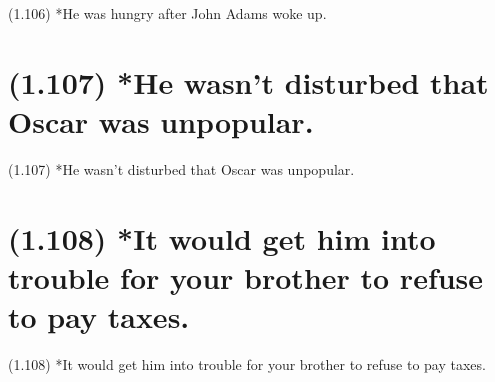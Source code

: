 \documentclass{article}
\begin{document}
\bigbreak
\begin{enumerate*}
\item[(1.106)] *He was hungry after John Adams woke up.
\end{enumerate*}
\bigbreak

\clearpage

%
%

\section*{(1.107) *He wasn't disturbed that Oscar was unpopular.}

\bigbreak
\begin{enumerate*}
\item[(1.107)] *He wasn't disturbed that Oscar was unpopular.
\end{enumerate*}
\bigbreak

\clearpage

%
%

\section*{(1.108) *It would get him into trouble for your brother to refuse to pay taxes.}

\bigbreak
\begin{enumerate*}
\item[(1.108)] *It would get him into trouble for your brother to refuse to pay taxes.
\end{enumerate*}
\bigbreak
\end{document}
